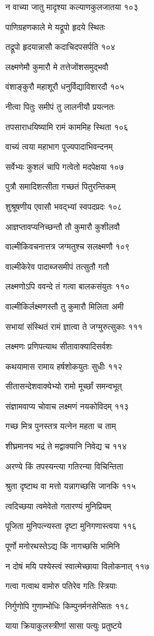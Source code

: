 न वाच्या जातु मादृश्या कल्याणकुलजातया १०३

पाणिग्रहणकाले मे यद्रूपो हृदये स्थितः

तद्रूपो हृदयान्नासौ कदाचिदपसर्पति १०४

लक्ष्मणेमौ कुमारौ मे तत्तेजोंशसमुद्भवौ

वंशाङ्कुरौ महाशूरौ धनुर्विद्याविशारदौ १०५

नीत्वा पितुः समीपं तु लालनीयौ प्रयत्नतः

तपसाराधयिष्यामि रामं काममिह स्थिता १०६

वाच्यं त्वया महाभाग पूज्यपादाभिवन्दनम्

सर्वेभ्यः कुशलं चापि गत्वेतो मदपेक्षया १०७

पुत्रौ समादिशत्सीता गच्छतं पितुरन्तिकम्

शुश्रूषणीय एवासौ भवद्भ्यां स्वपदप्रदः १०८

आज्ञप्तावप्यनिच्छन्तौ तौ कुमारौ कुशीलवौ

वाल्मीकिवचनात्तत्र जग्मतुश्च सलक्ष्मणौ १०९

वाल्मीकेरेव पादाब्जसमीपं तत्सुतौ गतौ

लक्ष्मणोऽपि ववन्दे तं गत्वा बालकसंयुतः ११०

वाल्मीकिर्लक्ष्मणस्तौ तु कुमारौ मिलिता अमी

सभायां संस्थितं रामं ज्ञात्वा ते जग्मुरुत्सुकाः १११

लक्ष्मणः प्रणिपत्याथ सीतावाक्यादिसर्वशः

कथयामास रामाय हर्षशोकयुतः सुधीः ११२

सीतासन्देशवाक्येभ्यो रामो मूर्च्छां समन्वभूत्

संज्ञामवाप्य चोवाच लक्ष्मणं नयकोविदम् ११३

गच्छ मित्र पुनस्तत्र यत्नेन महता च ताम्

शीघ्रमानय भद्रं ते मद्वाक्यानि निवेद्य च ११४

अरण्ये किं तपस्यन्त्या गतिरन्या विचिन्तिता

श्रुता दृष्टाथ वा मत्तो यन्नागच्छसि जानकि ११५

त्वदिच्छया त्वमेवेतो गतारण्यं मुनिप्रियम्

पूजिता मुनिपत्न्यस्ता दृष्टा मुनिगणास्त्वया ११६

पूर्णो मनोरथस्तेऽद्य किं नागच्छसि भामिनि

न दोषं मयि पश्येस्त्वं स्वात्मेच्छाया विलोकनात् ११७

गत्वा गत्वाथ वामोरु पतिरेव गतिः स्त्रियाः

निर्गुणोपि गुणाम्भोधिः किम्पुनर्मनसेप्सितः ११८

याया क्रियाकुलस्त्रीणां सासा पत्युः प्रतुष्टये

